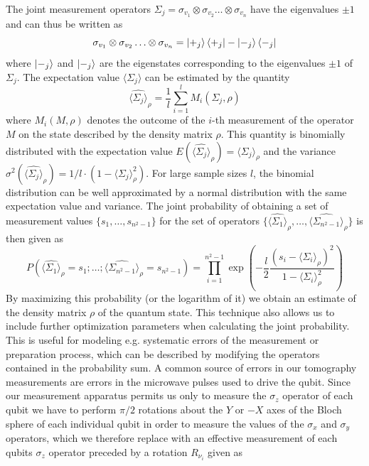 The joint measurement operators $\Sigma_j = \sigma_{v_1}\otimes \sigma_{v_2}\hdots \otimes\sigma_{v_n}$ have the eigenvalues $\pm 1$ and can thus be written as 
\begin{equation}
\sigma_{v_1}\otimes \sigma_{v_2}\hdots \otimes\sigma_{v_n} = \left| +_j \right>\left< +_j \right|-\left| -_j \right>\left< -_j \right|
\end{equation}
where $\left| -_j \right>$ and $\left| -_j \right>$ are the eigenstates corresponding to the eigenvalues $\pm 1$ of $\Sigma_j$. The expectation value $\langle \Sigma_j \rangle$ can be estimated by the quantity
\begin{equation}
\widehat{\langle \Sigma_j \rangle}_\rho = \frac{1}{l}\sum\limits_{i = 1}^l M_i(\Sigma_j,\rho) \label{eq:tomography_measurement_estimator}
\end{equation}
 where $M_i(M,\rho)$ denotes the outcome of the $i$-th measurement of the operator $M$ on the state described by the density matrix $\rho$. This quantity is binomially distributed with the expectation value $E(\widehat{\langle \Sigma_j \rangle}_\rho) = \langle \Sigma_j \rangle_\rho$ and the variance $\sigma^2(\widehat{\langle \Sigma_j \rangle}_\rho) = 1/l \cdot (1-\langle \Sigma_j \rangle_\rho^2)$. For large sample sizes $l$, the binomial distribution can be well approximated by a normal distribution with the same expectation value and variance. The joint probability of obtaining a set of measurement values $\{s_1,\hdots,s_{n^2-1}\}$ for the set of operators $\{\widehat{\langle\Sigma_1 \rangle}_\rho,\hdots,\widehat{\langle\Sigma_{n^2-1} \rangle}_\rho\}$ is then given as
\begin{equation}
P\left(\widehat{\langle \Sigma_1 \rangle }_\rho = s_1;\hdots;\widehat{\langle \Sigma_{n^2-1} \rangle}_\rho =  s_{n^2-1}\right) = \prod\limits_{i = 1}^{n^2-1} \exp{\left(-\frac{l}{2}\frac{(s_i-\langle \Sigma_i \rangle_\rho)^2}{1-\langle \Sigma_i \rangle_\rho^2}\right)}
\end{equation}
By maximizing this probability (or the logarithm of it) we obtain an estimate of the density matrix $\rho$ of the quantum state. This technique also allows us to include further optimization parameters when calculating the joint probability. This is useful for modeling e.g. systematic errors of the measurement or preparation process, which can be described by modifying the operators contained in the probability sum. A common source of errors in our tomography measurements are errors in the microwave pulses used to drive the qubit. Since our measurement apparatus permits us only to measure the $\sigma_z$ operator of each qubit we have to perform $\pi/2$ rotations about the $Y$ or $-X$ axes of the Bloch sphere of each individual qubit in order to measure the values of the $\sigma_x$ and $\sigma_y$ operators, which we therefore replace with an effective measurement of each qubits $\sigma_z$ operator preceded by a rotation $R_{\nu_i}$ given as
